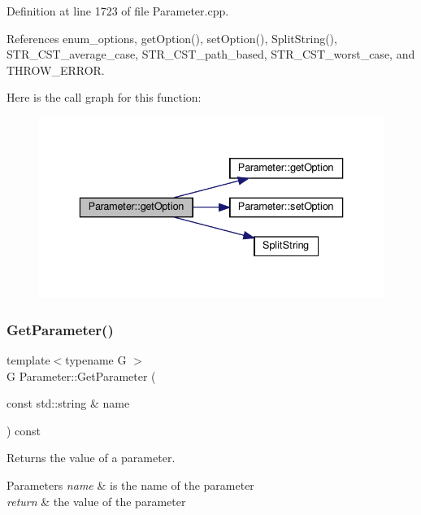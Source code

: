 Definition at line 1723 of file Parameter.\+cpp.



References enum\+\_\+options, get\+Option(), set\+Option(), Split\+String(), S\+T\+R\+\_\+\+C\+S\+T\+\_\+average\+\_\+case, S\+T\+R\+\_\+\+C\+S\+T\+\_\+path\+\_\+based, S\+T\+R\+\_\+\+C\+S\+T\+\_\+worst\+\_\+case, and T\+H\+R\+O\+W\+\_\+\+E\+R\+R\+OR.

Here is the call graph for this function\+:
\nopagebreak
\begin{figure}[H]
\begin{center}
\leavevmode
\includegraphics[width=336pt]{dc/dab/classParameter_a043bb297ec248aa92ee9078cfe2907ec_cgraph}
\end{center}
\end{figure}
\mbox{\label{classParameter_ac3f1eab3305dc5d06a411e632aa607c4}} 
\subsubsection{\texorpdfstring{Get\+Parameter()}{GetParameter()}}
{\footnotesize\ttfamily template$<$typename G $>$ \\
G Parameter\+::\+Get\+Parameter (\begin{DoxyParamCaption}\item[{const std\+::string \&}]{name }\end{DoxyParamCaption}) const\hspace{0.3cm}{\ttfamily [inline]}}



Returns the value of a parameter. 


\begin{DoxyParams}{Parameters}
{\em name} & is the name of the parameter \\
\hline
{\em return} & the value of the parameter \\
\hline
\end{DoxyParams}



